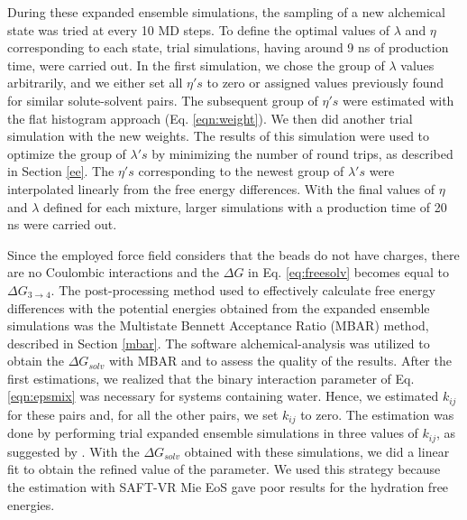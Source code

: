 During these expanded ensemble simulations, the sampling of a new alchemical state was tried at every 10 MD steps. To define the optimal values of $\lambda$ and $\eta$ corresponding to each state, trial simulations, having around 9 ns of production time, were carried out. In the first simulation, we chose the group of $\lambda$ values arbitrarily, and we either set all $\eta 's$ to zero or assigned values previously found for similar solute-solvent pairs. The subsequent group of $\eta 's$ were estimated with the flat histogram approach (Eq. \eqref{eqn:weight}). We then did another trial simulation with the new weights. The results of this simulation were used to optimize the group of $\lambda 's$ by minimizing the number of round trips, as described in Section \ref{ee}. The $\eta 's$ corresponding to the newest group of $\lambda 's$ were interpolated linearly from the free energy differences. With the final values of $\eta$ and $\lambda $ defined for each mixture, larger simulations with a production time of 20 ns were carried out. 

Since the employed force field considers that the beads do not have charges, there are no Coulombic interactions and the $\Delta G$ in Eq. \eqref{eq:freesolv} becomes equal to $\Delta G_{3 \rightarrow 4} $. The post-processing method used to effectively calculate free energy differences with the potential energies obtained from the expanded ensemble simulations was the Multistate Bennett Acceptance Ratio (MBAR) method, described in Section \ref{mbar}. The software alchemical-analysis \cite{klimovich} was utilized to obtain the $\Delta G_{solv}$ with MBAR and to assess the quality of the results. After the first estimations, we realized that the binary interaction parameter of Eq. \eqref{eqn:epsmix} was necessary for systems containing water. Hence, we estimated  $k_{ij}$ for these pairs and, for all the other pairs, we set  $k_{ij}$ to zero. The estimation was done by performing trial expanded ensemble simulations in three values of $k_{ij}$, as suggested by . With the $\Delta G_{solv}$ obtained with these simulations, we did a linear fit to obtain the refined value of the parameter. We used this strategy because the estimation with SAFT-VR Mie EoS gave poor results for the hydration free energies.

